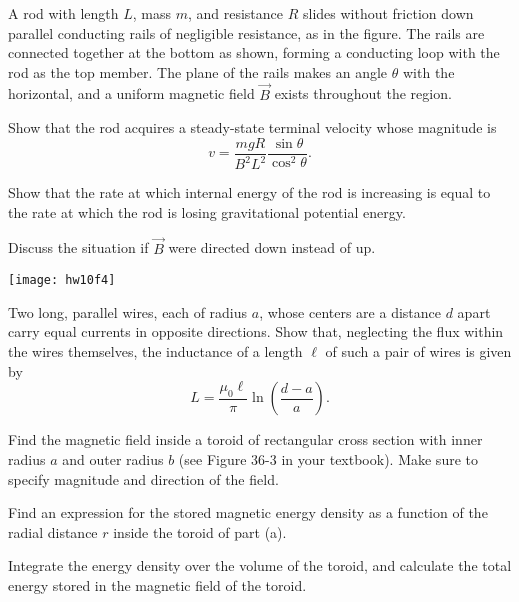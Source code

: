 \documentclass[11pt]{hmcpset}
\begin{document}
\begin{problem}[4. HRK: P34.9]
A rod with length $L$, mass $m$, and resistance $R$ slides without friction down parallel conducting rails of negligible resistance, as in the figure. The rails are connected together at the bottom as shown, forming a conducting loop with the rod as the top member. The plane of the rails makes an angle $\theta$ with the horizontal, and a uniform magnetic field $\vec{B}$ exists throughout the region. 

 Show that the rod acquires a steady-state terminal velocity whose magnitude is
\begin{equation*}
v = \frac{mgR}{B^2L^2}\frac{\sin{\theta}}{\cos^2{\theta}}.
\end{equation*}

 Show that the rate at which internal energy of the rod is increasing is equal to the rate at which the rod is losing gravitational potential energy.

 Discuss the situation if $\vec{B}$ were directed down instead of up. 
\begin{center}
		\texttt{[image: hw10f4]}
		\end{center}
\end{problem}
\newpage

\begin{problem}[5. HRK: E36.P3]
 Two long, parallel wires, each of radius $a$, whose centers are a distance $d$ apart carry equal currents in opposite directions. Show that, neglecting the flux within the wires themselves, the inductance of a length $\ell$ of such a pair of wires is given by
\begin{equation*}
L = \frac{\mu_0 \ell}{\pi}\ln\left( \frac{d-a}{a} \right).
\end{equation*}
\end{problem}
\newpage

\begin{problem}[*6. HRK: P36.9 (a)]
Find the magnetic field inside a toroid
of rectangular cross section with inner radius $a$ and outer radius
$b$ (see Figure 36-3 in your textbook).  Make sure to specify
magnitude and direction of the field.

 Find an expression for the stored magnetic energy
density as a function of the radial distance $r$ inside the toroid of
part (a).

 Integrate the energy density over the volume of
the toroid, and calculate the total energy stored in the magnetic
field of the toroid.

\end{problem}
\begin{flushleft}

\newpage
\end{flushleft}
\end{document}
